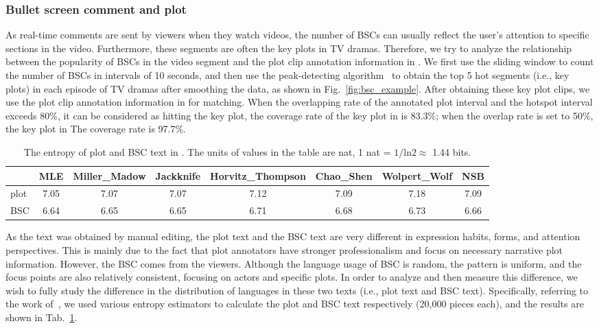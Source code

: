 \subsubsection{Bullet screen comment and plot}
\label{sec:bsc_plot}
As real-time comments are sent by viewers when they watch videos, the number of BSCs can usually reflect the user's attention to specific sections in the video. 
Furthermore, these segments are often the key plots in TV dramas.
Therefore, we try to analyze the relationship between the popularity of BSCs in the video segment and the plot clip annotation information in \TVD.
We first use the sliding window to count the number of BSCs in intervals of 10 seconds, and then use the peak-detecting algorithm~\citep{peakdet2006bio} to obtain the top 5 hot segments (i.e., key plots) in each episode of TV dramas after smoothing the data, as shown in Fig.~\ref{fig:bsc_example}.
After obtaining these key plot clips, we use the plot clip annotation information in \TVD for matching.
When the overlapping rate of the annotated plot interval and the hotspot interval exceeds 80\%, it can be considered as hitting the key plot, the coverage rate of the key plot in \TVD is 83.3\%; when the overlap rate is set to 50\%, the key plot in \TVD The coverage rate is 97.7\%.

\begin{table}
\centering
\small
\begin{tabular}{lccccccc}
\toprule
 & MLE & Miller\_Madow & Jackknife & Horvitz\_Thompson & Chao\_Shen & Wolpert\_Wolf & NSB \\
\midrule
plot & 7.05 & 7.07 & 7.07 & 7.12 & 7.09 & 7.18 & 7.09 \\
BSC & 6.64 & 6.65 & 6.65 & 6.71 & 6.68 & 6.73 & 6.66 \\
\bottomrule
\end{tabular}
\caption{\label{tab:entropy}
The entropy of plot and BSC text in \TVD. 
The units of values in the table are nat, 1 nat = $1/\mathrm{ln}2 \approx$ 1.44 bits.
}
\end{table}

As the text was obtained by manual editing, the plot text and the BSC text are very different in expression habits, forms, and attention perspectives.
This is mainly due to the fact that plot annotators have stronger professionalism and focus on necessary narrative plot information.
However, the BSC comes from the viewers. 
Although the language usage of BSC is random, the pattern is uniform, and the focus points are also relatively consistent, focusing on actors and specific plots.
In order to analyze and then measure this difference, we wish to fully study the difference in the distribution of languages in these two texts (i.e., plot text and BSC text).
Specifically, referring to the work of~\citep{entropy2022acl}, we used various entropy estimators to calculate the plot and BSC text respectively (20,000 pieces each), and the results are shown in Tab.~\ref{tab:entropy}.

